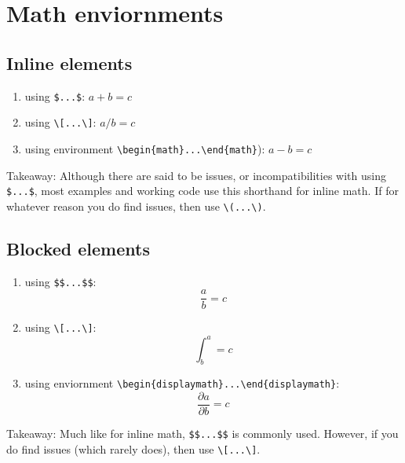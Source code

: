 \documentclass[12pt]{article}
\begin{document}
\setlength\parindent{0pt}

\section{Math enviornments}
\subsection*{Inline elements}
\begin{enumerate}
	\item using \verb!$...$!: $a+b=c$ 
	\item using \verb!\[...\]!: \(a/b=c\) 
	\item using environment \verb!\begin{math}...\end{math}!): 
		\begin{math}
		a - b = c
		\end{math}
\end{enumerate}
Takeaway: Although there are said to be issues, or incompatibilities with using \verb!$...$!, most examples and working code use this shorthand for inline math. If for whatever reason you do find issues, then use \verb!\(...\)!.

\subsection*{Blocked elements}
\begin{enumerate}
	\item using \verb!$$...$$!: $$ \frac{a}{b}=c $$
	\item using \verb!\[...\]!: \[ \int^a_b = c\]
	\item using enviornment \verb!\begin{displaymath}...\end{displaymath}!:
		\begin{displaymath}
		\dfrac{\partial a}{\partial	b} = c
		\end{displaymath}
\end{enumerate}
Takeaway: Much like for inline math, \verb!$$...$$! is commonly used. However, if you do find issues (which rarely does), then use \verb!\[...\]!. 
\end{document}
